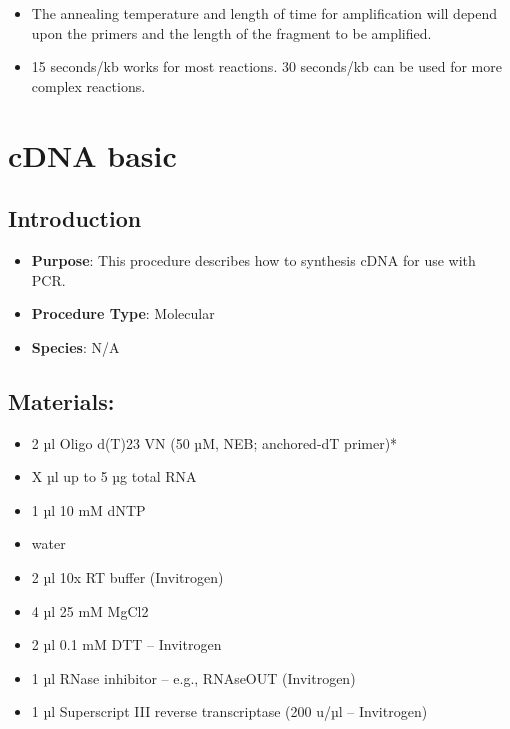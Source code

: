 \documentclass[
  letterpaper,
  DIV=11,
  numbers=noendperiod]{scrreprt}
\providecommand{\tightlist}{%
  \setlength{\itemsep}{0pt}\setlength{\parskip}{0pt}}\usepackage{longtable,booktabs,array}
\begin{document}
\begin{tcolorbox}[enhanced jigsaw, rightrule=.15mm, title=\textcolor{quarto-callout-note-color}{\faInfo}\hspace{0.5em}{Anneal temperature and length of amplification step}, titlerule=0mm, opacitybacktitle=0.6, toprule=.15mm, bottomrule=.15mm, opacityback=0, left=2mm, colframe=quarto-callout-note-color-frame, breakable, coltitle=black, colback=white, colbacktitle=quarto-callout-note-color!10!white, bottomtitle=1mm, leftrule=.75mm, toptitle=1mm, arc=.35mm]

\begin{itemize}
\tightlist
\item
  The annealing temperature and length of time for amplification will
  depend upon the primers and the length of the fragment to be
  amplified.
\item
  15 seconds/kb works for most reactions. 30 seconds/kb can be used for
  more complex reactions.
\end{itemize}

\end{tcolorbox}

\hypertarget{sec-molecular-cDNA}{%
\chapter{cDNA basic}\label{sec-molecular-cDNA}}

\hypertarget{introduction-10}{%
\section{Introduction}\label{introduction-10}}

\begin{itemize}
\tightlist
\item
  \textbf{Purpose}: This procedure describes how to synthesis cDNA for
  use with PCR.
\item
  \textbf{Procedure Type}: Molecular
\item
  \textbf{Species}: N/A
\end{itemize}

\hypertarget{materials-10}{%
\section{Materials:}\label{materials-10}}

\begin{itemize}
\tightlist
\item
  2 µl Oligo d(T)23 VN (50 µM, NEB; anchored-dT primer)*
\item
  X µl up to 5 µg total RNA
\item
  1 µl 10 mM dNTP
\item
  water
\item
  2 µl 10x RT buffer (Invitrogen)
\item
  4 µl 25 mM MgCl2
\item
  2 µl 0.1 mM DTT -- Invitrogen
\item
  1 µl RNase inhibitor -- e.g., RNAseOUT (Invitrogen)
\item
  1 µl Superscript III reverse transcriptase (200 u/µl -- Invitrogen)
\end{itemize}
\end{document}
